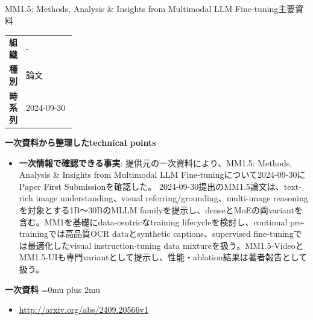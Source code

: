 \begin{technicalnote}{MM1.5: Methods, Analysis \& Insights from Multimodal LLM Fine-tuning}{主要資料}
\begingroup
\begin{tabularx}{\linewidth}{@{}>{\bfseries}p{0.22\linewidth}X@{}}
組織 & - \\
種別 & 論文 \\
時系列 & 2024-09-30 \\
\end{tabularx}
\smallskip
{\bfseries 一次資料から整理したtechnical points}
\begin{itemize}[leftmargin=1.5em,itemsep=0.35em]
\item \textbf{一次情報で確認できる事実}: 提供元の一次資料により、MM1.5: Methods, Analysis \& Insights from Multimodal LLM Fine-tuningについて2024-09-30にPaper First Submissionを確認した。 2024-09-30提出のMM1.5論文は、text-rich image understanding、visual referring/grounding、multi-image reasoningを対象とする1B〜30BのMLLM familyを提示し、denseとMoEの両variantを含む。MM1を基礎にdata-centricなtraining lifecycleを検討し、continual pre-trainingでは高品質OCR dataとsynthetic captions、supervised fine-tuningでは最適化したvisual instruction-tuning data mixtureを扱う。MM1.5-VideoとMM1.5-UIも専門variantとして提示し、性能・ablation結果は著者報告として扱う。
\end{itemize}
\begin{minipage}{\linewidth}
\begin{samepage}
{\bfseries 一次資料}
\begingroup\sloppy
\Urlmuskip=0mu plus 2mu\relax
\begin{itemize}[leftmargin=1.5em,itemsep=0.25em]
\item {\scriptsize\url{http://arxiv.org/abs/2409.20566v1}}
\end{itemize}
\endgroup
\end{samepage}
\end{minipage}
\endgroup
\end{technicalnote}
\medskip

